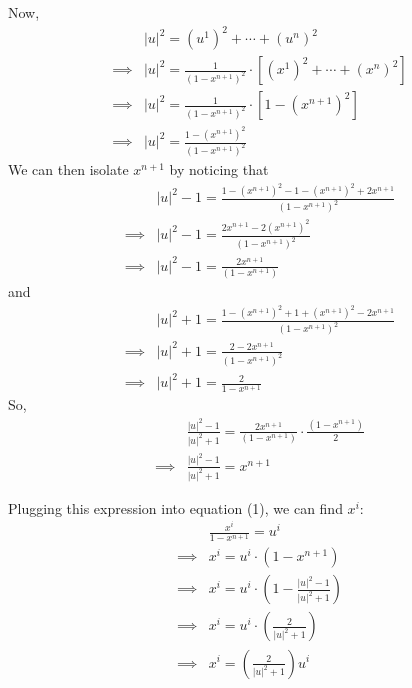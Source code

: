\documentclass{article}
\begin{document}
\begin{enumerate}[label=(\alph*)]
\begin{enumerate}[label=(\arabic*),ref=\arabic*]
    Now, 
    \begin{align*}
      &\lvert u \rvert^2 = (u^1)^2 + \cdots + (u^n)^2 \\
      \implies& \lvert u \rvert^2 = \frac{1}{(1-x^{n+1})^2} \cdot \left[ (x^1)^2 + \cdots + (x^{n})^2 \right] \\
      \implies& \lvert u \rvert^2 = \frac{1}{(1-x^{n+1})^2} \cdot \left[ 1 - (x^{n+1})^2 \right] \\
      \implies& \boxed{\lvert u \rvert^2 = \frac{ 1 - (x^{n+1})^2 }{(1-x^{n+1})^2} } 
    \end{align*}
    \vskip 0.5cm
    We can then isolate $x^{n+1}$ by noticing that
    \begin{align*}
      &\lvert u \rvert^2 - 1 = \frac{1 - (x^{n+1})^2 - 1 - (x^{n+1})^2 + 2x^{n+1}}{(1 - x^{n+1})^2} \\
      \implies&\lvert u \rvert^2 - 1 = \frac{2x^{n+1} - 2(x^{n+1})^2}{(1 - x^{n+1})^2} \\
      \implies&\lvert u \rvert^2 - 1 = \frac{2x^{n+1}}{(1 - x^{n+1})} 
    \end{align*}
    and
    \begin{align*}
      &\lvert u \rvert^2 + 1 = \frac{1 - (x^{n+1})^2 + 1 + (x^{n+1})^2 - 2x^{n+1}}{(1 - x^{n+1})^2} \\
      \implies&\lvert u \rvert^2 + 1 = \frac{2 - 2x^{n+1}}{(1 - x^{n+1})^2}\\
      \implies&\lvert u \rvert^2 + 1 = \frac{2}{1-x^{n+1}} 
    \end{align*}
    So, 
    \begin{align*}
      &\frac{\lvert u \rvert^2 - 1}{\lvert u \rvert^2 + 1} = \frac{2x^{n+1}}{(1 - x^{n+1})} \cdot \frac{(1 - x^{n+1})}{2} \\
      \implies& \boxed{\frac{\lvert u \rvert^2 - 1}{\lvert u \rvert^2 + 1} = x^{n+1}}
    \end{align*}

    \vskip 0.5cm
    Plugging this expression into equation (1), we can find $x^i$:
    \begin{align*}
      &\frac{x^i}{1-x^{n+1}} = u^i \\
      \implies&x^i = u^i \cdot (1-x^{n+1}) \\
      \implies&x^i = u^i \cdot \left( 1 - \frac{\lvert u \rvert^2 - 1}{\lvert u \rvert^2 + 1} \right) \\
      \implies&x^i = u^i \cdot \left( \frac{2}{\lvert u \rvert^2 + 1} \right) \\
      \implies& \boxed{x^i = \left( \frac{2}{\lvert u \rvert^2 + 1} \right) u^i}
    \end{align*}
    

\end{enumerate}
\end{enumerate}
\end{document}
